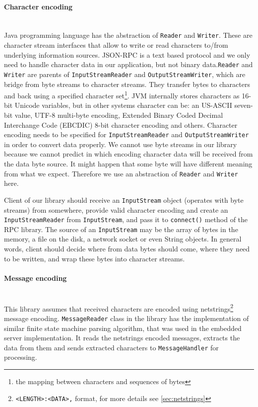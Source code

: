 \paragraph{Character encoding} ~\\
Java programming language has the abstraction of \texttt{Reader} and
\texttt{Writer}. These are character stream interfaces that allow to write or
read characters to/from underlying information sources. JSON-RPC is a text
based protocol and we only need to handle character data in our application, but
not binary data.\texttt{Reader} and \texttt{Writer} are parents of
\texttt{InputStreamReader} and \texttt{OutputStreamWriter}, which are bridge
from byte streams to character streams. They transfer bytes to characters and
back using a specified character set\footnote{the mapping between characters and sequences of bytes}.
JVM internally stores characters as 16-bit Unicode variables, but in other
systems character can be:  an US-ASCII seven-bit value, UTF-8 multi-byte
encoding, Extended Binary Coded Decimal Interchange Code (EBCDIC) 8-bit
character encoding and others. Character encoding needs to be specified for
\texttt{InputStreamReader} and \texttt{OutputStreamWriter} in order to convert
data properly. We cannot use byte streams in our library because we cannot
predict in which encoding character data will be received from the data byte
source. It might happen that some byte will have different meaning from what we
expect. Therefore we use an abstraction of \texttt{Reader} and
\texttt{Writer} here.

Client of our library should receive an \texttt{InputStream}  object (operates
with byte streams) from somewhere, provide valid character encoding and create
an \texttt{InputStreamReader} from \texttt{InputStream}, and pass it to
\texttt{connect()} method of the RPC library. The source of an
\texttt{InputStream} may be the array of bytes in the memory, a file on the
disk, a network socket or even String objects. In general words, client should
decide where from data bytes should come, where they need to be written, and
wrap these bytes into character streams.

\paragraph{Message encoding} ~\\

This library assumes that received characters are encoded using
netstrings\footnote{ \texttt{<LENGTH>:<DATA>,} format, for more details see
\autoref{sec:netstrings} } message encoding.
\texttt{MessageReader} class in the library has the implementation of similar finite
state machine parsing algorithm, that was used in the embedded server implementation.
It reads the netstrings encoded messages, extracts the data from them and sends extracted characters to
\texttt{MessageHandler} for processing.


